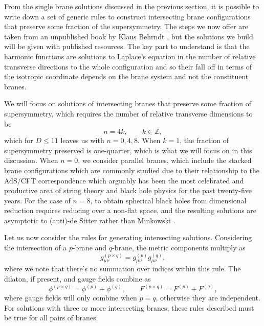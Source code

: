From the single brane solutions discussed in the previous section, it is possible to write down a set of generic rules to construct intersecting brane configurations that preserve some fraction of the supersymmetry. The steps we now offer are taken from an unpublished book by Klaus Behrndt \cite{Behrndt}, but the solutions we build will be given with published resources. The key part to understand is that the harmonic functions are solutions to Laplace's equation in the number of relative transverse directions to the whole configuration and so their fall off in terms of the isotropic coordinate depends on the brane system and not the constituent branes.

We will focus on solutions of intersecting branes that preserve some fraction of supersymmetry, which requires the number of relative transverse dimensions to be
\begin{equation*}
	n = 4 k, \qquad k \in \mathbb{Z},
\end{equation*}
which for $D \leq 11$ leaves us with $n = 0,4,8$. When $k = 1$, the fraction of supersymmetry preserved is one-quarter, which is what we will focus on in this discussion. When $n = 0$, we consider parallel branes, which include the stacked brane configurations which are commonly studied due to their relationship to the AdS/CFT correspondence \cite{Maldacena:1997re, Witten:1998qj, Maldacena:1996ky} which arguably has been the most celebrated and productive area of string theory and black hole physics for the past twenty-five years. For the case of $n = 8$, to obtain spherical black holes from dimensional reduction requires reducing over a non-flat space, and the resulting solutions are asymptotic to (anti)-de Sitter rather than Minkowski \cite{Behrndt}.

Let us now consider the rules for generating intersecting solutions. Considering the intersection of a $p$-brane and $q$-brane, the metric components multiply as
	\begin{equation*}
		g^{(p \times q)}_{\mu \nu} = g^{(p)}_{\mu \nu} g^{(q)}_{\mu \nu},
	\end{equation*}
	where we note that there's no summation over indices within this rule. The dilaton, if present, and gauge fields combine as
	\begin{equation*}
		\phi^{(p \times q)} = \phi^{(p)} + \phi^{(q)}, \qquad F^{(p \times q)} = F^{(p)} + F^{(q)},
	\end{equation*}
	where gauge fields will only combine when $p = q$, otherwise they are independent. For solutions with three or more intersecting branes, these rules described must be true for all pairs of branes. 
	
